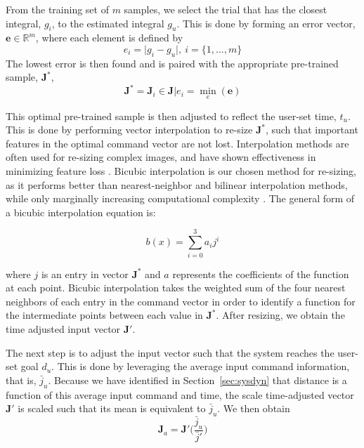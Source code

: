 \documentclass[letterpaper, 10 pt, conference]{ieeeconf}  %
\newcommand\NB[1]{$\spadesuit$\footnote{NB: #1}}
\newcommand{\R}{\mathbb{R}}
\begin{document}
From the training set of $m$ samples, we select the trial that has the closest integral, $g_i$, to the estimated integral $g_u$. This is done by forming an error vector, $\bm{e}\in\R^{m}$, where each element is defined by
\begin{equation}
 e_i = \vert g_i-g_u \vert , ~i= \{1,\ldots,m\}
\end{equation}
 The lowest error is then found and is paired with the appropriate pre-trained sample, $\bm{J}^*$,
\begin{equation}
\bm{J}^* = \bm{J}_i \in \bm{J}\vert e_i = \min_e(\bm{e})
\end{equation}

This optimal pre-trained sample is then adjusted to reflect the user-set time, $t_u$. This is done by performing vector interpolation to re-size $\bm{J}^*$, such that important features in the optimal command vector are not lost. Interpolation methods are often used for re-sizing complex images, and have shown effectiveness in minimizing feature loss \cite{bicfeatures}. Bicubic interpolation is our chosen method for re-sizing, as it performs better than nearest-neighbor and bilinear interpolation methods, while only marginally increasing computational complexity \cite{biccomp}. The general form of a bicubic interpolation equation is: 

\begin{equation} \label{eq:bicinter}
    b(x) = \sum_{i=0}^3a_ij^i
\end{equation}

where $j$ is an entry in vector $\bm{J}^*$ and $a$ represents the coefficients of the function at each point. Bicubic interpolation takes the weighted sum of the four nearest neighbors of each entry in the command vector in order to identify a function for the intermediate points between each value in $\bm{J}^*$. After resizing, we obtain the time adjusted input vector $\bm{J}'$.

The next step is to adjust the input vector such that the system reaches the user-set goal $d_u$. This is done by leveraging the average input command information, that is, $\bar{j}_u$. Because we have identified in Section~\ref{sec:sysdyn} that distance is a function of this average input command and time, the scale time-adjusted vector $\bm{J}'$ is scaled such that its mean is equivalent to $\bar{j}_u$. We then obtain
\begin{equation} \label{eq:imgscale}
\bm{J}_a = \bm{J}'\bigg(\frac{\bar{j}_u}{\bar{j}'}\bigg)
\end{equation}
\end{document}
